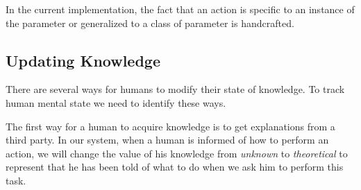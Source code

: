 \documentclass{llncs}
\begin{document}






In the current implementation, the fact that an action is specific to an instance of the parameter or generalized to a class of parameter is handcrafted.


\subsection{Updating Knowledge}

There are several ways for humans to modify their state of knowledge. To track human mental state we need to identify these ways.

The first way for a human to acquire knowledge is to get explanations from a third party. In our system, when a human is informed of how to perform an action, we will change the value of his knowledge from \textit{unknown} to \textit{theoretical} to represent that he has been told of what to do when we ask him to perform this task.
\end{document}

